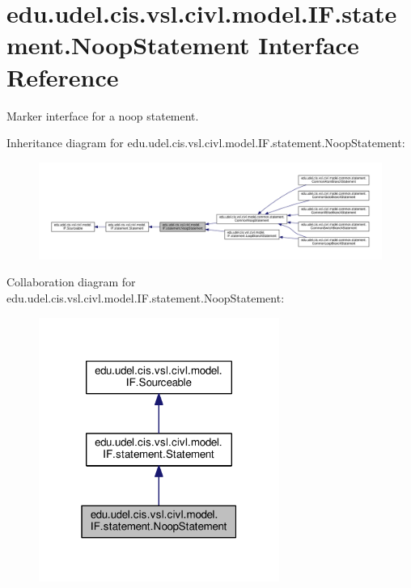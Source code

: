\hypertarget{interfaceedu_1_1udel_1_1cis_1_1vsl_1_1civl_1_1model_1_1IF_1_1statement_1_1NoopStatement}{}\section{edu.\+udel.\+cis.\+vsl.\+civl.\+model.\+I\+F.\+statement.\+Noop\+Statement Interface Reference}
\label{interfaceedu_1_1udel_1_1cis_1_1vsl_1_1civl_1_1model_1_1IF_1_1statement_1_1NoopStatement}


Marker interface for a noop statement.  




Inheritance diagram for edu.\+udel.\+cis.\+vsl.\+civl.\+model.\+I\+F.\+statement.\+Noop\+Statement\+:
\nopagebreak
\begin{figure}[H]
\begin{center}
\leavevmode
\includegraphics[width=350pt]{interfaceedu_1_1udel_1_1cis_1_1vsl_1_1civl_1_1model_1_1IF_1_1statement_1_1NoopStatement__inherit__graph}
\end{center}
\end{figure}


Collaboration diagram for edu.\+udel.\+cis.\+vsl.\+civl.\+model.\+I\+F.\+statement.\+Noop\+Statement\+:
\nopagebreak
\begin{figure}[H]
\begin{center}
\leavevmode
\includegraphics[width=223pt]{interfaceedu_1_1udel_1_1cis_1_1vsl_1_1civl_1_1model_1_1IF_1_1statement_1_1NoopStatement__coll__graph}
\end{center}
\end{figure}
